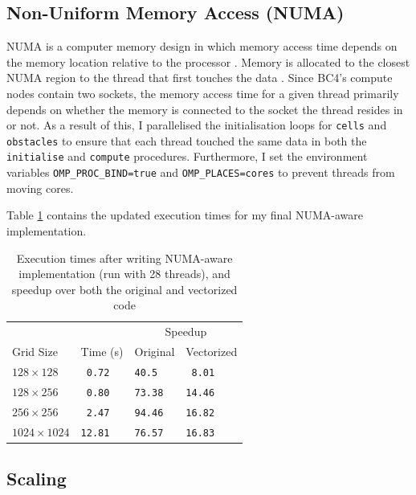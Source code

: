 \documentclass[twocolumn, a4paper]{article}
\begin{document}
\subsection{Non-Uniform Memory Access (NUMA)}

NUMA is a computer memory design in which memory access time depends on the memory location relative to the processor \cite{numa}.
Memory is allocated to the closest NUMA region to the thread that first touches the data \cite{numa_bristol}.
Since BC4's compute nodes contain two sockets, the memory access time for a given thread primarily depends on whether the memory is connected to the socket the thread resides in or not.
As a result of this, I parallelised the initialisation loops for \texttt{cells} and \texttt{obstacles} to ensure that each thread touched the same data in both the \texttt{initialise} and \texttt{compute} procedures.
Furthermore, I set the environment variables \texttt{OMP\_PROC\_BIND=true} and \texttt{OMP\_PLACES=cores} to prevent threads from moving cores.

Table \ref{tab:numa} contains the updated execution times for my final NUMA-aware implementation.

\begin{table}[htbp]
  \begin{center}
  \caption{Execution times after writing NUMA-aware implementation (run with 28 threads), and speedup over both the original and vectorized code}\label{tab:numa}
  \begin{tabular}{l | l  l  l} 
      \hline\hline
      &&\multicolumn{2}{c}{Speedup}\\
      \cline{3-4}
      Grid Size&Time (s)&Original&Vectorized\\
      \hline
      $128 \times 128$&\texttt{ 0.72}&\texttt{40.5}&\texttt{ 8.01}\\
      $128 \times 256$&\texttt{ 0.80}&\texttt{73.38}&\texttt{14.46}\\
      $256 \times 256$&\texttt{ 2.47}&\texttt{94.46}&\texttt{16.82}\\
      $1024 \times 1024$&\texttt{12.81}&\texttt{76.57}&\texttt{16.83}\\
      \hline
    \end{tabular}
  \end{center}
\end{table}

\subsection{Scaling}
\end{document}
